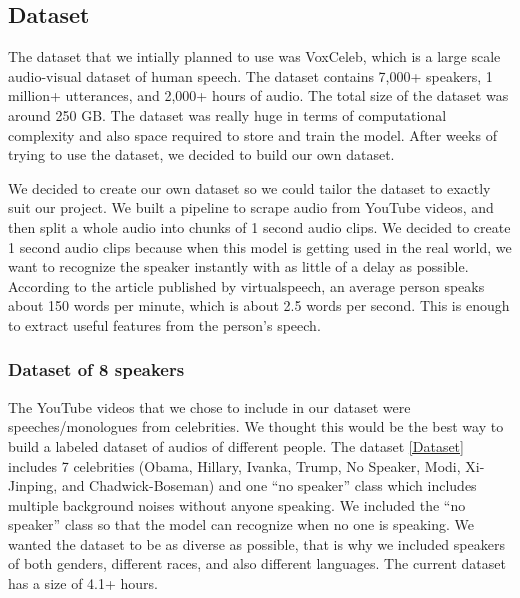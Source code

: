 \documentclass[10pt,twocolumn,letterpaper]{article}
\begin{document}
\subsection{Dataset}

The dataset that we intially planned to use was VoxCeleb, which is a large scale audio-visual dataset of human speech. The dataset contains 7,000+ speakers, 1 million+ utterances, and 2,000+ hours of audio. The total size of the dataset was around 250 GB. The dataset was really huge in terms of computational complexity and also space required to store and train the model. After weeks of trying to use the dataset, we decided to build our own dataset. 

We decided to create our own dataset so we could tailor the dataset to exactly suit our project. We built a pipeline to scrape audio from YouTube videos, and then split a whole audio into chunks of 1 second audio clips. We decided to create 1 second audio clips because when this model is getting used in the real world, we want to recognize the speaker instantly with as little of a delay as possible. According to the article \cite{Barnard} published by virtualspeech, an average person speaks about 150 words per minute, which is about 2.5 words per second. This is enough to extract useful features from the person’s speech.  


\subsubsection{Dataset of 8 speakers}

The YouTube videos that we chose to include in our dataset were speeches/monologues from celebrities. We thought this would be the best way to build a labeled dataset of audios of different people. The dataset \ref{Dataset} includes 7 celebrities (Obama, Hillary, Ivanka, Trump, No Speaker, Modi, Xi-Jinping, and Chadwick-Boseman) and one “no speaker” class which includes multiple background noises without anyone speaking. We included the “no speaker” class so that the model can recognize when no one is speaking.  We wanted the dataset to be as diverse as possible, that is why we included speakers of both genders, different races, and also different languages. The current dataset has a size of 4.1+ hours. 
\end{document}
